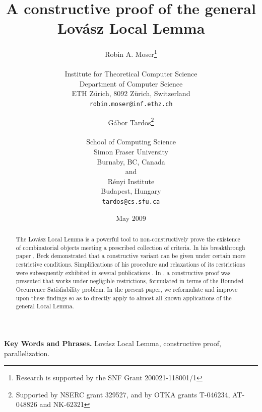\documentclass[11pt,a4paper]{article}
\begin{document}
\title{A constructive proof of the general Lov\'asz Local Lemma}
\author{Robin A. Moser\thanks{Research is
   supported by the SNF Grant 200021-118001/1}
\\ \vspace{0.1cm} \\
\small
Institute for Theoretical Computer Science\\
\small
Department of Computer Science\\
\small
ETH Z\"urich, 8092 Z\"urich, Switzerland\\
\small
\texttt{robin.moser@inf.ethz.ch}
\and
G\'abor Tardos\thanks{Supported by NSERC grant 329527, and by OTKA grants
T-046234, AT-048826 and NK-62321}
\\ \vspace{0.1cm} \\
\small
School of Computing Science\\
\small
Simon Fraser University\\
\small
Burnaby, BC, Canada\\
\small
and\\
\small
R\'enyi Institute\\
\small
Budapest, Hungary\\
\small
\texttt{tardos@cs.sfu.ca}
}
\date{May 2009}
\maketitle

\begin{abstract} 
The Lov\'asz Local Lemma \cite{EL75} is a powerful tool to non-constructively prove the existence of combinatorial objects meeting
a prescribed collection of criteria. In his breakthrough paper \cite{Bec91}, Beck demonstrated that a constructive variant can be
given under certain more restrictive conditions. Simplifications of his procedure and relaxations of its restrictions were subsequently 
exhibited in several publications \cite{Alo91,MR98,CS00,Mos06,Sri08,Mos08a}. In \cite{Mos08b}, a constructive proof was presented that works under
negligible restrictions, formulated in terms of the Bounded Occurrence Satisfiability problem. In the present paper, we reformulate
and improve upon these findings so as to directly apply to almost all known applications of the general Local Lemma.
\end{abstract}

\smallskip
\noindent
\textbf{Key Words and Phrases.} Lov\'asz Local Lemma, constructive proof, parallelization.
\end{document}
